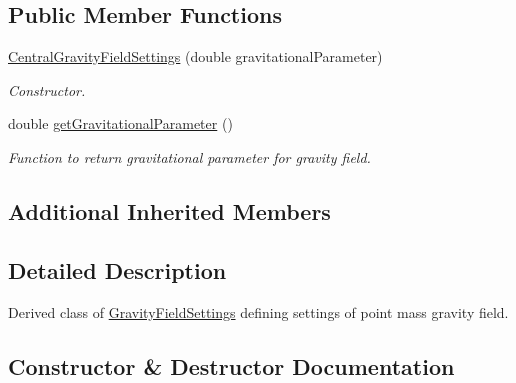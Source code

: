\subsection*{Public Member Functions}
\begin{DoxyCompactItemize}
\item 
\hyperlink{classtudat_1_1simulation__setup_1_1CentralGravityFieldSettings_a5a73181da4f204e4b4e61cb842fc85c9}{Central\+Gravity\+Field\+Settings} (double gravitational\+Parameter)
\begin{DoxyCompactList}\small\item\em Constructor. \end{DoxyCompactList}\item 
double \hyperlink{classtudat_1_1simulation__setup_1_1CentralGravityFieldSettings_afdcfa7ae589e429969062d0bca465ff5}{get\+Gravitational\+Parameter} ()
\begin{DoxyCompactList}\small\item\em Function to return gravitational parameter for gravity field. \end{DoxyCompactList}\end{DoxyCompactItemize}
\subsection*{Additional Inherited Members}


\subsection{Detailed Description}
Derived class of \hyperlink{classtudat_1_1simulation__setup_1_1GravityFieldSettings}{Gravity\+Field\+Settings} defining settings of point mass gravity field. 

\subsection{Constructor \& Destructor Documentation}
